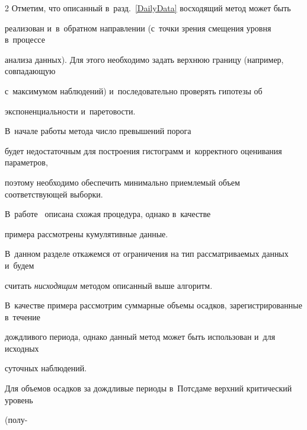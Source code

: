 \begin{multicols}{2}
Отметим, что описанный в~разд.~\ref{DailyData} восходящий метод может быть 


реализован и~в~обратном на\-прав\-ле\-нии (с~точки зрения смещения уровня в~процессе 


анализа данных). Для этого необходимо задать верхнюю границу (например, совпадающую 


с~максимумом наблюдений) и~последовательно проверять гипотезы об 


экспоненциальности и~па\-ре\-то\-вости. 





В~начале работы метода число превышений поро\-га 


будет недостаточным для построения гис\-то\-грамм и~корректного оценивания параметров, 


поэтому необходимо обеспечить минимально приемлемый объем соответствующей выборки. 





В~работе~\cite{Gorshenin2016a} описана схожая процедура, однако в~качестве 


примера рассмотрены кумулятивные данные. 


В~данном разделе откажемся от ограничения на тип рассматриваемых данных и~будем 


считать \textit{нисходящим} методом описанный выше алгоритм. 





В~качестве примера рассмотрим суммарные объемы осадков, зарегистрированные в~течение 


дождливого периода, однако данный метод может быть использован и~для исходных 


суточных на\-блю\-де\-ний.


{





}








Для объемов осадков за дождливые периоды в~Потсдаме верхний критический уровень 


(полу-\linebreak\vspace*{-12pt}





\pagebreak





\end{multicols}






